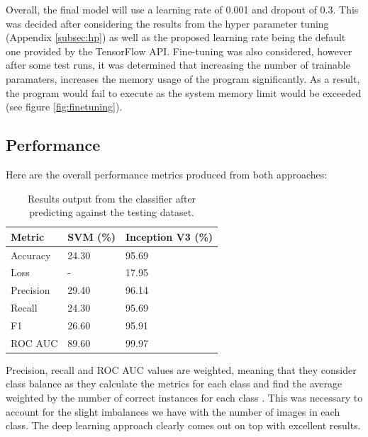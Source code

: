 \documentclass[12pt,a4paper]{report}
\begin{document}
\par

Overall, the final model will use a learning rate of 0.001 and dropout of 0.3. This was decided after considering the 
results from the hyper parameter tuning (Appendix \ref{subsec:hp}) as well as the proposed learning rate being the 
default one provided by the TensorFlow API. Fine-tuning was also considered, however after some test runs, it was
determined that increasing the number of trainable paramaters, increases the memory usage of the program significantly.
As a result, the program would fail to execute as the system memory limit would be exceeded 
(see figure \ref{fig:finetuning}).

\subsection{Performance}

Here are the overall performance metrics produced from both approaches:

\begin{table}[h!]
    \centering
    \begin{tabular}{ |l|l|l| }
        \hline
        Metric & SVM (\%) & Inception V3 (\%) \\
        \hline
        \hline
        Accuracy & 24.30 & 95.69 \\
        \hline
        Loss & - & 17.95 \\
        \hline
        Precision & 29.40 & 96.14 \\
        \hline
        Recall & 24.30 & 95.69 \\
        \hline
        F1 & 26.60 & 95.91 \\
        \hline
        ROC AUC & 89.60 & 99.97 \\
        \hline
    \end{tabular}
    \caption{Results output from the classifier after predicting against the testing dataset.}
    \label{table:2}
\end{table}

\break

Precision, recall and ROC AUC values are weighted, meaning that they consider class balance as they calculate the metrics
for each class and find the average weighted by the number of correct instances for each class 
\citep{scikitprec}. This was necessary to account for the slight imbalances we have with the number of images 
in each class. The deep learning approach clearly comes out on top with excellent results.
\end{document}
